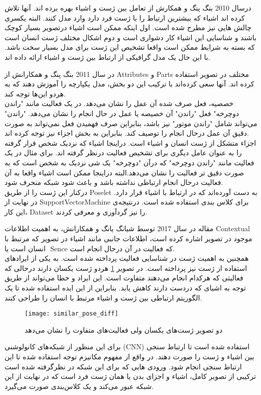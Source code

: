 درسال 2010 بنگ پنگ و همکارش %
\cite{ModelingMutual_OB_POSE}
از تعامل بین ژست و اشیاء بهره برده اند. آنها تلاش کرده اند اشیاء که بیشترین ارتباط را با ژست فرد دارد وارد مدل کنند. البته یکسری چالش هایی نیز مطرح شده است. اول اینکه ممکن است اشیاء درتصویر بسیار کوچک باشند و شناسایی این اشیاء کار دشواری است و دوم اشکال مختلف ژست انسان است که بسته به شرایط ممکن است واقعا تشخیص این ژست برای مدل بسیار سخت باشد. با این حال یک مدل گرافیکی از ارتباط بین ژست و اشیاء ارائه داده اند.

در سال 2011 بنگ پنگ و همکارانش %
\cite{HAR_learing_action_part}
از %
\gls{Attributes}
 و %
\gls{Parts}
 مختلف در تصویر استفاده کرده اند. آنها سعی کرده‌اند با ترکیب این دو بخش، مدل یکپارچه را آموزش دهند که به هردو این‌ها توجه کند.\\
 خصصیه، فعل صرف شده آن عمل را نشان می‌دهد. در یک فعالیت مانند "راندن دوچرخه" فعل "راندن" آن خصیصه یا عمل در حال انجام را نشان می‌دهد. "راندن" می‌تواند شامل "راندن موتور" نیز باشد،‌ بنابراین صرف فهمیدن فعل نمی‌تواند به صورت دقیق آن عمل درحال انجام را توصیف کند. بنابراین به بخش اجزاء نیز توجه کرده اند.\\
 اجزاء متشکل از ژست انسان و اشیاء است. دراینجا اشیاء که نزدیک شخص قرار گرفته را به عنوان عامل دیگری برای تشخیص فعالیت درنظر گرفته اند. برای مثال در یک فعالیت مانند "راندن دوچرخه" که درآن "دوچرخه" یک شی نزدیک به شخص است که به صورت دقیق تر فعالیت را نشان می‌دهد.البته دراینجا ممکن است اشیاء واقعا به آن فعالیت درحال انجام ارتباطی نداشته باشد و باعث شود شبکه منحرف شود.\\
 درکنار این ژست را از طریق Poselet%
  به دست آورده‌اند که در ارتباط با اشیاء قرار دارد. در نهایت از %
\gls{SupportVectorMachine}
 برای کلاس بندی استفاده شده است. درنتیجه‌ی این کار، %
\gls{Dataset}
 را نیز گردآوری و معرفی کردند.
 
 مقاله %
 \cite{Multi_branch_Attention_Recg_still}
 در سال 2017 توسط شیانگ یانگ و همکارانش، به اهمیت اطلاعات %
\gls{Contextual}
  موجود در تصویر اشاره کرده است، اطلاعات جانبی مانند اشیاء در تصویر که مرتبط با انسان است یا ‌%
\gls{Sence}
 که فعالیت در آن درحال انجام است.\\
 همچنین به اهمیت ژست در شناسایی فعالیت پرداخته شده است. به یکی از ایرادهای استفاده از ژست نیز پرداخته است. در تصویر %
\ref{fig:similar_pose_diff}
 هردو ژست یکسان دارند درحالی که فعالیتی که هرکدام انجام می‌دهند متفاوت است. این ایراد و خطا می‌تواند از طریق توجه به اشیای که دردست دارند کاهش یابد. بنابراین از این ایده استفاده شده تا یک الگوریتم ارتباطی بین ژست و اشیاء مرتبط با انسان را طراحی کنند.\\
 \begin{figure}[ht]
 	\centerline{\texttt{[image: similar\_pose\_diff]}}
 	\caption{دو تصویر ژست‌های یکسان ولی فعالیت‌های متفاوت را نشان می‌دهد
 		\cite{Multi_branch_Attention_Recg_still}
 		}
 	\label{fig:similar_pose_diff}
 \end{figure}
 برای این منظور از شبکه‌های کانولوشنی (CNN) استفاده شده است تا ارتباط سنجی بین اشیاء و ژست را صورت دهند. در واقع از مفهوم مکانیزم توجه استفاده شده تا این ارتباط سنجی انجام شود. ورودی هایی که برای این شبکه در نظرگرفته شده است ترکیبی از تصویر کامل، اشیاء و اجزای بدن یا همان ژست فرد است که در نهایت از این شبکه عبور می‌کند و یک کلاس‌بندی صورت می‌گیرد.\\ 
 
